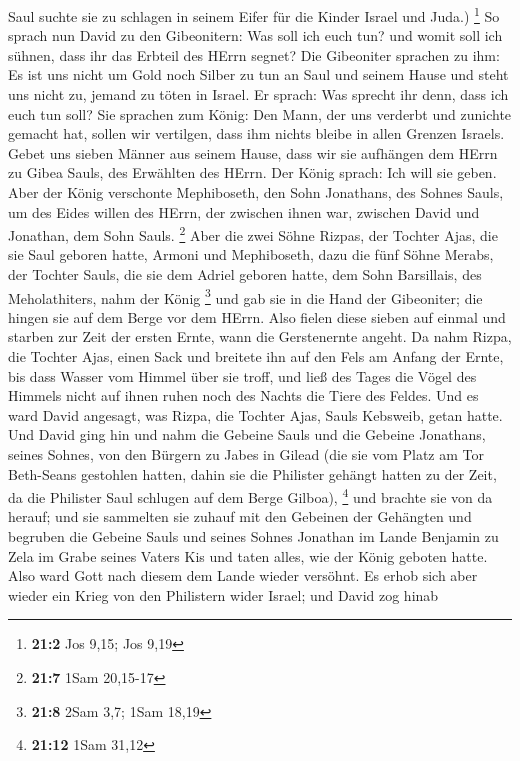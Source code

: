 Saul suchte sie zu schlagen in seinem Eifer für die Kinder Israel und
Juda.) \footnote{\textbf{21:2} Jos 9,15; Jos 9,19}  So
sprach nun David zu den Gibeonitern: Was soll ich euch tun? und womit
soll ich sühnen, dass ihr das Erbteil des HErrn segnet?  Die
Gibeoniter sprachen zu ihm: Es ist uns nicht um Gold noch Silber zu tun
an Saul und seinem Hause und steht uns nicht zu, jemand zu töten in
Israel. Er sprach: Was sprecht ihr denn, dass ich euch tun soll?
 Sie sprachen zum König: Den Mann, der uns verderbt und
zunichte gemacht hat, sollen wir vertilgen, dass ihm nichts bleibe in
allen Grenzen Israels.  Gebet uns sieben Männer aus seinem
Hause, dass wir sie aufhängen dem HErrn zu Gibea Sauls, des Erwählten
des HErrn. Der König sprach: Ich will sie geben.  Aber der
König verschonte Mephiboseth, den Sohn Jonathans, des Sohnes Sauls, um
des Eides willen des HErrn, der zwischen ihnen war, zwischen David und
Jonathan, dem Sohn Sauls. \footnote{\textbf{21:7} 1Sam 20,15-17}
 Aber die zwei Söhne Rizpas, der Tochter Ajas, die sie Saul
geboren hatte, Armoni und Mephiboseth, dazu die fünf Söhne Merabs, der
Tochter Sauls, die sie dem Adriel geboren hatte, dem Sohn Barsillais,
des Meholathiters, nahm der König \footnote{\textbf{21:8} 2Sam 3,7; 1Sam
  18,19}  und gab sie in die Hand der Gibeoniter; die hingen
sie auf dem Berge vor dem HErrn. Also fielen diese sieben auf einmal und
starben zur Zeit der ersten Ernte, wann die Gerstenernte angeht.
 Da nahm Rizpa, die Tochter Ajas, einen Sack und breitete
ihn auf den Fels am Anfang der Ernte, bis dass Wasser vom Himmel über
sie troff, und ließ des Tages die Vögel des Himmels nicht auf ihnen
ruhen noch des Nachts die Tiere des Feldes.  Und es ward
David angesagt, was Rizpa, die Tochter Ajas, Sauls Kebsweib, getan
hatte.  Und David ging hin und nahm die Gebeine Sauls und
die Gebeine Jonathans, seines Sohnes, von den Bürgern zu Jabes in Gilead
(die sie vom Platz am Tor Beth-Seans gestohlen hatten, dahin sie die
Philister gehängt hatten zu der Zeit, da die Philister Saul schlugen auf
dem Berge Gilboa), \footnote{\textbf{21:12} 1Sam 31,12} 
und brachte sie von da herauf; und sie sammelten sie zuhauf mit den
Gebeinen der Gehängten  und begruben die Gebeine Sauls und
seines Sohnes Jonathan im Lande Benjamin zu Zela im Grabe seines Vaters
Kis und taten alles, wie der König geboten hatte. Also ward Gott nach
diesem dem Lande wieder versöhnt.  Es erhob sich aber
wieder ein Krieg von den Philistern wider Israel; und David zog hinab

